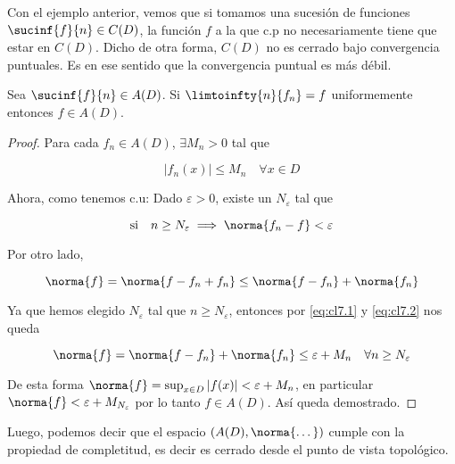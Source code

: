 Con el ejemplo anterior, vemos que si tomamos una sucesión de funciones $\sucinf{f}{n} \in C(D)$, la función $f$ a la que c.p no necesariamente tiene que estar en $C(D)$. Dicho de otra forma, $C(D)$ no es cerrado bajo convergencia puntuales. Es en ese sentido que la convergencia puntual es más débil.

\begin{pro}
    Sea $\sucinf{f}{n} \in A(D)$. Si $\limtoinfty{n}{f_n} = f$ uniformemente entonces $f \in A(D)$.
\end{pro}

\begin{proof}
    Para cada $f_n \in A(D)$, $\exists M_n > 0$ tal que
    
    \begin{equation}\label{eq:cl7.1}
        |f_n(x)| \leq M_n \quad \forall x \in D
    \end{equation}
    
    Ahora, como tenemos c.u: Dado $\varepsilon > 0$, existe un $N_{\varepsilon}$ tal que
    
    \begin{equation}\label{eq:cl7.2}
        \text{si} \quad n \geq N_{\varepsilon} \implies \norma{f_n - f} < \varepsilon
    \end{equation}
    
    Por otro lado,
    
    \[
    \norma{f} = \norma{f - f_n + f_n} \leq \norma{f - f_n} + \norma{f_n}
    \]
    
    Ya que hemos elegido $N_{\varepsilon}$ tal que $n \geq N_{\varepsilon}$, entonces por \ref{eq:cl7.1} y \ref{eq:cl7.2} nos queda
    
    \[
    \norma{f} = \norma{f - f_n} + \norma{f_n} \leq \varepsilon + M_n \quad \forall n \geq N_{\varepsilon}
    \]
    
    De esta forma $\norma{f} = \sup_{x \in D} |f(x)| < \varepsilon + M_n$, en particular $\norma{f} < \varepsilon + M_{N_{\varepsilon}}$ por lo tanto $f \in A(D)$. Así queda demostrado.
\end{proof}

Luego, podemos decir que el espacio $\left(A(D), \norma{\dots} \right)$ cumple con la propiedad de completitud, es decir es cerrado desde el punto de vista topológico.